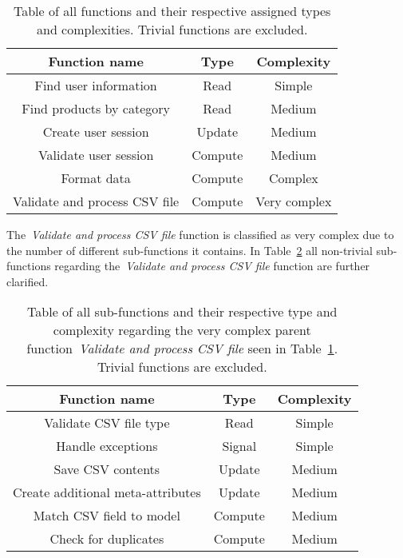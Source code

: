 \begin{table}[h]
    \centering
    \begin{tabular}{ccc}
        \toprule
        \textbf{Function name}
        & \textbf{Type}
        & \textbf{Complexity}
        \\ \midrule
        Find user information
        & Read
        & Simple
        \\ \midrule
        Find products by category
        & Read
        & Medium
        \\ \midrule
        Create user session
        & Update
        & Medium
        \\ \midrule
        Validate user session
        & Compute
        & Medium
        \\ \midrule
        Format data
        & Compute
        & Complex
        \\ \midrule
        Validate and process CSV file
        & Compute
        & Very complex
        \\ \bottomrule
    \end{tabular}%
    \caption{Table of all functions and their respective assigned types and complexities.
    Trivial functions are excluded.
    }\label{tab:functions}
\end{table}

The~\textit{Validate and process CSV file} function is classified as very complex due to the number of different
sub-functions it contains.
In Table~\ref{tab:functions-validate-and-process-csv-file} all non-trivial sub-functions regarding
the~\textit{Validate and process CSV file} function are further clarified.

\begin{table}[h]
    \centering
    \begin{tabular}{ccc}
        \toprule
        \textbf{Function name}
        & \textbf{Type}
        & \textbf{Complexity}
        \\ \midrule
        Validate CSV file type
        & Read
        & Simple
        \\ \midrule
        Handle exceptions
        & Signal
        & Simple
        \\ \midrule
        Save CSV contents
        & Update
        & Medium
        \\ \midrule
        Create additional meta-attributes
        & Update
        & Medium
        \\ \midrule
        Match CSV field to model
        & Compute
        & Medium
        \\ \midrule
        Check for duplicates
        & Compute
        & Medium
        \\ \bottomrule
    \end{tabular}%
    \caption{Table of all sub-functions and their respective type and complexity regarding the very complex parent
    function~\textit{Validate and process CSV file} seen in Table~\ref{tab:functions}.
    Trivial functions are excluded.
    }\label{tab:functions-validate-and-process-csv-file}
\end{table}
